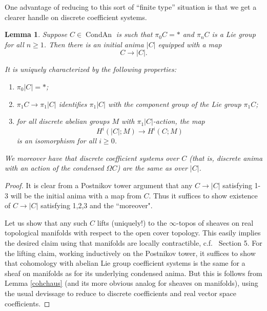 \documentclass[12pt]{article}
\newtheorem{lemma}[theorem]{Lemma}
\theoremstyle{definition}
\newcommand{\on}{\operatorname}
\begin{document}
One advantage of reducing to this sort of ``finite type'' situation is that we get a clearer handle on discrete coefficient systems.

\begin{lemma}\label{lietoan}
Suppose $C\in \on{CondAn}$ is such that $\pi_0C=\ast$ and $\pi_nC$ is a Lie group for all $n\geq 1$.  Then there is an initial anima $|C|$ equipped with a map
$$C\to |C|.$$

It is uniquely characterized by the following properties:
\begin{enumerate}
\item $\pi_0|C|=\ast$;
\item $\pi_1C \to \pi_1|C|$ identifies $\pi_1|C|$ with the component group of the Lie group $\pi_1C$;
\item for all discrete abelian groups $M$ with $\pi_1|C|$-action, the map
$$H^i(|C|;M) \to H^i(C;M)$$
is an isomorphism for all $i\geq 0$.
\end{enumerate}

We moreover have that discrete coefficient systems over $C$ (that is, discrete anima with an action of the condensed $\Omega C$) are the same as over $|C|$.

\end{lemma}
\begin{proof}
It is clear from a Postnikov tower argument that any $C\to |C|$ satisfying 1-3 will be the initial anima with a map from $C$.  Thus it suffices to show existence of $C\to |C|$ satisfying 1,2,3 and the ``moreover".

Let us show that any such $C$ lifts (uniquely!) to the $\infty$-topos of sheaves on real topological manifolds with respect to the open cover topology.  This easily implies the desired claim using that manifolds are locally contractible, c.f.\ \cite{clausen} Section 5.  For the lifting claim, working inductively on the Postnikov tower, it suffices to show that cohomology with abelian Lie group coefficient systems is the same for a sheaf on manifolds as for its underlying condensed anima.  But this is follows from Lemma \ref{cohchaus} (and its more obvious analog for sheaves on manifolds), using the usual devissage to reduce to discrete coefficients and real vector space coefficients.\end{proof}
\end{document}
